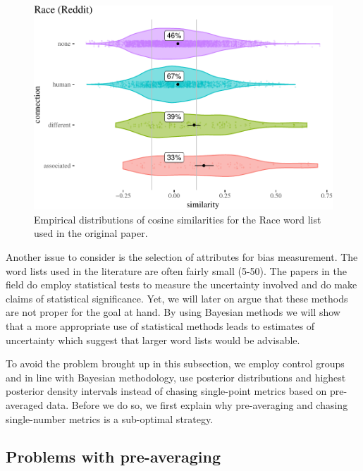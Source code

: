 \documentclass{clv3}
\begin{document}
\begin{figure}

\begin{center}\includegraphics[width=0.7\linewidth]{figures/figcosineDistributions8dg} \end{center}

\caption{Empirical distributions of cosine similarities  for the Race word list used in  the original paper.  }

\label{fig:empirical3}
\end{figure}

Another issue to consider is the selection of attributes for bias
measurement. The word lists used in the literature are often fairly
small (5-50). The papers in the field do employ statistical tests to
measure the uncertainty involved and do make claims of statistical
significance. Yet, we will later on argue that these methods are not
proper for the goal at hand. By using Bayesian methods we will show that
a more appropriate use of statistical methods leads to estimates of
uncertainty which suggest that larger word lists would be advisable.

To avoid the problem brought up in this subsection, we employ control
groups and in line with Bayesian methodology, use posterior
distributions and highest posterior density intervals instead of chasing
single-point metrics based on pre-averaged data. Before we do so, we
first explain why pre-averaging and chasing single-number metrics is a
sub-optimal strategy.













\hypertarget{problems-with-pre-averaging}{%
\subsection{Problems with
pre-averaging}\label{problems-with-pre-averaging}}
\end{document}
